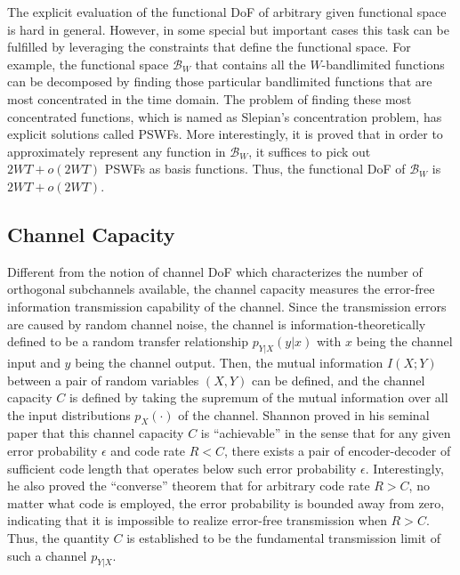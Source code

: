 \documentclass[journal,twocolumn]{IEEEtran}
\begin{document}
The explicit evaluation of the functional DoF of arbitrary given functional space is hard in general. However, in some special but important cases this task can be fulfilled by leveraging the constraints that define the functional space.
For example, the functional space $\mathcal{B}_W$ that contains all the $W$-bandlimited functions can be decomposed by finding those particular bandlimited functions that are most concentrated in the time domain. The problem of finding these most concentrated functions, which is named as Slepian's concentration problem, has explicit solutions called PSWFs.
More interestingly, it is proved that in order to approximately represent any function in $\mathcal{B}_W$, it suffices to pick out $2WT+o(2WT)$ PSWFs as basis functions. Thus, the functional DoF of $\mathcal{B}_W$ is $2WT+o(2WT)$. 


\subsection{Channel Capacity}
\label{Sec_2_Subsec_2}
Different from the notion of channel DoF which characterizes the number of orthogonal subchannels available, the channel capacity measures the error-free information transmission capability of the channel. 
Since the transmission errors are caused by random channel noise, the channel is information-theoretically defined to be a random transfer relationship $p_{Y|X}(y|x)$ with $x$ being the channel input and $y$ being the channel output. 
Then, the mutual information $I(X; Y)$ between a pair of random variables $(X, Y)$ can be defined, and the channel capacity $C$ is defined by taking the supremum of the mutual information over all the input distributions $p_X(\cdot)$ of the channel. Shannon proved in his seminal paper \cite{shannon1948mathematical} that this channel capacity $C$ is ``achievable'' in the sense that for any given error probability $\epsilon$ and code rate $R<C$, there exists a pair of encoder-decoder of sufficient code length that operates below such error probability $\epsilon$. 
Interestingly, he also proved the ``converse'' theorem that for arbitrary code rate $R>C$, no matter what code is employed, the error probability is bounded away from zero, indicating that it is impossible to realize error-free transmission when $R>C$. Thus, the quantity $C$ is established to be the fundamental transmission limit of such a channel $p_{Y|X}$. 
\end{document}
